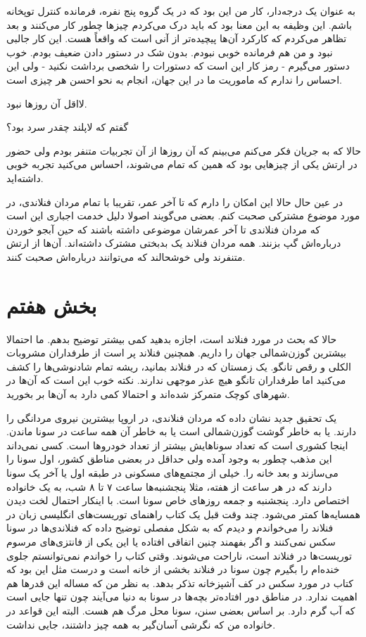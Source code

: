 به عنوان یک درجه‌دار، کار من این بود که در یک گروه پنج نفره، فرمانده
کنترل توپخانه باشم. این وظیفه به این معنا بود که باید درک می‌کردم چیزها
چطور کار می‌کنند و بعد تظاهر می‌کردم که کارکرد آن‌ها پیچیده‌تر از آنی است
که واقعاً هست. این کار جالبی نبود و من هم فرمانده خوبی نبودم. بدون شک
در دستور دادن ضعیف بودم. خوب دستور می‌گیرم - رمز کار این است که دستورات
را شخصی برداشت نکنید - ولی این احساس را ندارم که ماموریت ما در این
جهان، انجام به نحو احسن هر چیزی است.

لااقل آن روزها نبود.

گفتم که لاپلند چقدر سرد بود؟

حالا که به جریان فکر می‌کنم می‌بینم که آن روزها از آن تجربیات متنفر بودم
ولی حضور در ارتش یکی از چیزهایی بود که همین که تمام می‌شوند، احساس
می‌کنید تجربه خوبی داشته‌اید.

در عین حال حالا این امکان را دارم که تا آخر عمر، تقریبا با تمام مردان
فنلاندی، در مورد موضوع مشترکی صحبت کنم. بعضی می‌گویند اصولا دلیل خدمت
اجباری این است که مردان فنلاندی تا آخر عمرشان موضوعی داشته باشند که
حین آبجو خوردن درباره‌اش گپ بزنند. همه مردان فنلاند یک بدبختی مشترک
داشته‌اند. آن‌ها از ارتش متنفرند ولی خوشحالند که می‌توانند درباره‌اش صحبت
کنند.

\section{بخش هفتم}
حالا که بحث در مورد فنلاند است، اجازه بدهید کمی بیشتر توضیح بدهم. ما
احتمالا بیشترین گوزن‌شمالی جهان را داریم. همچنین فنلاند پر است از
طرفداران مشروبات الکلی و رقص تانگو. یک زمستان که در فنلاند بمانید،
ریشه تمام شادنوشی‌ها را کشف می‌کنید اما طرفداران تانگو هیچ عذر موجهی
ندارند. نکته خوب این است که آن‌ها در شهرهای کوچک متمرکز شده‌اند و احتمالا
کمی دارد به آن‌ها بر بخورید.

یک تحقیق جدید نشان داده که مردان فنلاندی، در اروپا بیشترین نیروی
مردانگی را دارند. یا به خاطر گوشت گوزن‌شمالی است یا به خاطر آن همه ساعت
در سونا ماندن. اینجا کشوری است که تعداد سوناهایش بیشتر از تعداد
خودروها است. کسی نمی‌داند این مذهب چطور به وجود آمده ولی حداقل در بعضی
مناطق کشور، اول سونا را می‌سازند و بعد خانه را. خیلی از مجتمع‌های مسکونی
در طبقه اول یا آخر یک سونا دارند که در هر ساعت از هفته، مثلا پنجشنبه‌ها
ساعت ۷ تا ۸ شب، به یک خانواده اختصاص دارد. پنجشنبه و جمعه روزهای خاص
سونا است. با اینکار احتمال لخت دیدن همسایه‌ها کمتر می‌شود. چند وقت قبل
یک کتاب راهنمای توریست‌های انگلیسی زبان در فنلاند را می‌خواندم و دیدم که
به شکل مفصلی توضیح داده که فنلاندی‌ها در سونا سکس نمی‌کنند و اگر بفهمند
چنین اتفاقی افتاده یا این یکی از فانتزی‌های مرسوم توریست‌ها در فنلاند
است، ناراحت می‌شوند. وقتی کتاب را خواندم نمی‌توانستم جلوی خنده‌ام را
بگیرم چون سونا در فنلاند بخشی از خانه است و درست مثل این بود که کتاب
در مورد سکس در کف آشپزخانه تذکر بدهد. به نظر من که مساله این قدرها هم
اهمیت ندارد. در مناطق دور افتاده‌تر بچه‌ها در سونا به دنیا می‌آیند چون
تنها جایی است که آب گرم دارد. بر اساس بعضی سنن، سونا محل مرگ هم
هست. البته این قواعد در خانواده من که نگرشی آسان‌گیر به همه چیز داشتند،
جایی نداشت.


